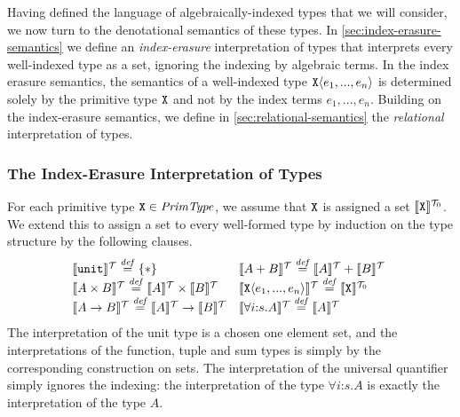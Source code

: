 Having defined the language of algebraically-indexed types that we
will consider, we now turn to the denotational semantics of these
types. In \autoref{sec:index-erasure-semantics} we define an
\emph{index-erasure} interpretation of types that interprets every
well-indexed type as a set, ignoring the indexing by algebraic
terms. In the index erasure semantics, the semantics of a well-indexed
type $\texttt{X}\langle e_1,...,e_n \rangle$ is determined solely by the primitive
type $\texttt{X}$ and not by the index terms $e_1,...,e_n$. Building
on the index-erasure semantics, we define in
\autoref{sec:relational-semantics} the \emph{relational}
interpretation of types.


\subsubsection{The Index-Erasure Interpretation of Types}
\label{sec:index-erasure-semantics}

For each primitive type $\texttt{X} \in \mathit{PrimType}$, we assume
that $\texttt{X}$ is assigned a set $\llbracket \texttt{X} \rrbracket^{\mathcal{T}_0}$. We
extend this to assign a set to every well-formed type by induction on
the type structure by the following clauses.
\begin{displaymath}
  \begin{array}{@{\hspace{0.2em}}c@{\hspace{0em}}c}
    \begin{array}{l}
      \tySem{\tyUnit} \isDefinedAs \{*\} \\
      \tySem{A \tyProduct B} \isDefinedAs \tySem{A} \times \tySem{B} \\
      \tySem{A \tyArr B} \isDefinedAs \tySem{A} \to \tySem{B} \\
    \end{array}
    &
    \begin{array}{l}
      \tySem{A + B} \isDefinedAs \tySem{A} + \tySem{B} \\
      \tySem{\tyPrim{X}{e_1,...,e_n}} \isDefinedAs \tyPrimSem{\tyPrimNm{X}} \\
      \tySem{\forall i\mathord:s. A} \isDefinedAs \tySem{A}
    \end{array}
  \end{array}
\end{displaymath}
The interpretation of the unit type is a chosen one element set, and
the interpretations of the function, tuple and sum types is simply by
the corresponding construction on sets. The interpretation of the
universal quantifier simply ignores the indexing: the interpretation
of the type $\forall i\mathord:s.A$ is exactly the interpretation of
the type $A$.

